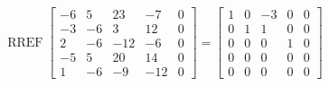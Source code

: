 \begin{exerciseAnswer} 


\[\operatorname{RREF} \left[\begin{array}{cccc|c}
-6 & 5 & 23 & -7 & 0 \\
-3 & -6 & 3 & 12 & 0 \\
2 & -6 & -12 & -6 & 0 \\
-5 & 5 & 20 & 14 & 0 \\
1 & -6 & -9 & -12 & 0
\end{array}\right] = \left[\begin{array}{cccc|c}
1 & 0 & -3 & 0 & 0 \\
0 & 1 & 1 & 0 & 0 \\
0 & 0 & 0 & 1 & 0 \\
0 & 0 & 0 & 0 & 0 \\
0 & 0 & 0 & 0 & 0
\end{array}\right] \]



\end{exerciseAnswer}
